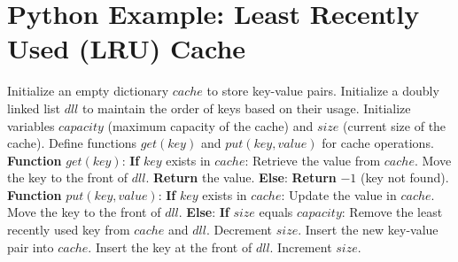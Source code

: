 \documentclass[12pt]{book} %
\begin{document}
\section*{Python Example: Least Recently Used (LRU) Cache}
\begin{algorithm}
\caption{LRU Cache}
\begin{algorithmic}[1]
\State Initialize an empty dictionary $cache$ to store key-value pairs.
\State Initialize a doubly linked list $dll$ to maintain the order of keys based on their usage.
\State Initialize variables $capacity$ (maximum capacity of the cache) and $size$ (current size of the cache).
\State Define functions $get(key)$ and $put(key, value)$ for cache operations.
\State \textbf{Function} $get(key)$:
    \State \hspace{\algorithmicindent} \textbf{If} $key$ exists in $cache$:
        \State \hspace{\algorithmicindent} Retrieve the value from $cache$.
        \State \hspace{\algorithmicindent} Move the key to the front of $dll$.
        \State \hspace{\algorithmicindent} \textbf{Return} the value.
    \State \hspace{\algorithmicindent} \textbf{Else}:
        \State \hspace{\algorithmicindent} \textbf{Return} $-1$ (key not found).
\State \textbf{Function} $put(key, value)$:
    \State \hspace{\algorithmicindent} \textbf{If} $key$ exists in $cache$:
        \State \hspace{\algorithmicindent} Update the value in $cache$.
        \State \hspace{\algorithmicindent} Move the key to the front of $dll$.
    \State \hspace{\algorithmicindent} \textbf{Else}:
        \State \hspace{\algorithmicindent} \textbf{If} $size$ equals $capacity$:
            \State \hspace{\algorithmicindent} Remove the least recently used key from $cache$ and $dll$.
            \State \hspace{\algorithmicindent} Decrement $size$.
        \State \hspace{\algorithmicindent} Insert the new key-value pair into $cache$.
        \State \hspace{\algorithmicindent} Insert the key at the front of $dll$.
        \State \hspace{\algorithmicindent} Increment $size$.
\end{algorithmic}
\end{algorithm}
\FloatBarrier
\end{document}
